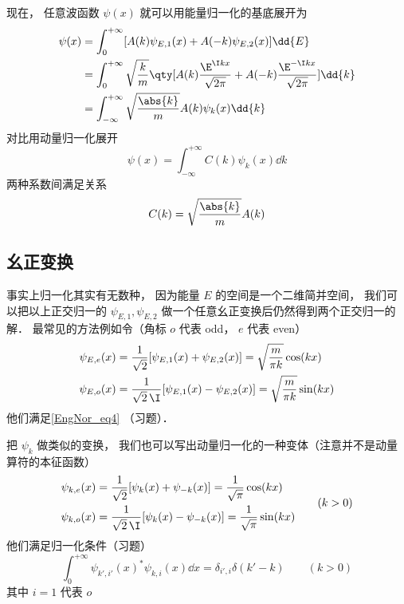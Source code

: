 现在， 任意波函数 $\psi(x)$ 就可以用能量归一化的基底展开为%
\begin{equation}
\begin{aligned}
\psi(x) &= \int_0^{+\infty} [A(k) \psi_{E,1}(x) + A(-k) \psi_{E,2}(x)] \dd{E}\\
&= \int_0^{+\infty} \sqrt{\frac{k}{m}}\qty[A(k) \frac{\E^{\I kx}}{\sqrt{2\pi}} + A(-k)\frac{\E^{-\I kx}}{\sqrt{2\pi}}]\dd{k}\\
&= \int_{-\infty}^{+\infty} \sqrt{\frac{\abs{k}}{m}}A(k) \psi_k(x) \dd{k}
\end{aligned}
\end{equation}
对比用动量归一化展开
\begin{equation}
\psi(x) = \int_{-\infty}^{+\infty} C(k)\psi_k(x) \dd{k}
\end{equation}
两种系数间满足关系
\begin{equation}
C(k) = \sqrt{\frac{\abs{k}}{m}}A(k)
\end{equation}

\subsection{幺正变换}
事实上归一化其实有无数种， 因为能量 $E$ 的空间是一个二维简并空间， 我们可以把以上正交归一的 $\psi_{E,1}, \psi_{E,2}$ 做一个任意幺正变换后仍然得到两个正交归一的解． 最常见的方法例如令（角标 $o$ 代表 odd， $e$ 代表 even）
\begin{equation}
\begin{aligned}
\psi_{E,e}(x) &= \frac{1}{\sqrt{2}}[\psi_{E,1}(x) + \psi_{E,2}(x)] = \sqrt{\frac{m}{\pi k}}\cos(kx)\\
\psi_{E,o}(x) &= \frac{1}{\sqrt{2}\,\I}[\psi_{E,1}(x) - \psi_{E,2}(x)] = \sqrt{\frac{m}{\pi k}}\sin(kx)
\end{aligned}
\end{equation}
他们满足\autoref{EngNor_eq4} （习题）．

把 $\psi_k$ 做类似的变换， 我们也可以写出动量归一化的一种变体（注意并不是动量算符的本征函数）
\begin{equation}
\begin{aligned}
\psi_{k,e}(x) &= \frac{1}{\sqrt{2}}[\psi_{k}(x) + \psi_{-k}(x)] = \frac{1}{\sqrt{\pi}}\cos(kx)\\
\psi_{k,o}(x) &= \frac{1}{\sqrt{2}\,\I}[\psi_{k}(x) - \psi_{-k}(x)] = \frac{1}{\sqrt{\pi}}\sin(kx)
\end{aligned}
\qquad (k > 0)
\end{equation}
他们满足归一化条件（习题）
\begin{equation}
\int_{0}^{+\infty} \psi_{k',i'}(x)^* \psi_{k,i}(x) \dd{x} = \delta_{i',i}\delta(k' - k) \qquad (k > 0)
\end{equation}
其中 $i = 1$ 代表 $o$